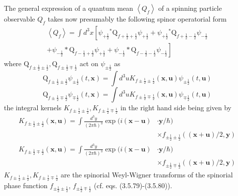 \documentclass{article}
\begin{document}
The general expression of a quantum mean $\left\langle Q_{f}\right\rangle$ of a spinning particle observable $Q_{f}$ takes now presumably the following spinor operatorial form
$$
\begin{array}{r}
\left\langle Q_{f}\right\rangle=\int d^{3} x\left[\psi_{+\frac{1}{2}}{ }^{*} \mathrm{Q}_{f+\frac{1}{2}+\frac{1}{2}} \psi_{+\frac{1}{2}}+\psi_{+\frac{1}{2}}{ }^{*} \mathrm{Q}_{f+\frac{1}{2}-\frac{1}{2}} \psi_{-\frac{1}{2}}\right.  \tag{3.21.12}\\
\left.+\psi_{-\frac{1}{2}} * \mathrm{Q}_{f-\frac{1}{2}+\frac{1}{2}} \psi_{+\frac{1}{2}}+\psi_{-\frac{1}{2}} * \mathrm{Q}_{f-\frac{1}{2}-\frac{1}{2}} \psi_{-\frac{1}{2}}\right]
\end{array}
$$
where $\mathrm{Q}_{f \pm \frac{1}{2} \pm \frac{1}{2}}, \mathrm{Q}_{f \pm \frac{1}{2} \mp \frac{1}{2}}$ act on $\psi_{ \pm \frac{1}{2}}$ as
$$
\begin{equation*}
\mathrm{Q}_{f \pm \frac{1}{2} \pm \frac{1}{2}} \psi_{ \pm \frac{1}{2}}(t, \boldsymbol{x})=\int d^{3} u K_{f \pm \frac{1}{2} \pm \frac{1}{2}}(\boldsymbol{x}, \boldsymbol{u}) \psi_{ \pm \frac{1}{2}}(t, \boldsymbol{u}) \tag{3.21.13a}
\end{equation*}
$$
$$
\begin{equation*}
\mathrm{Q}_{f \pm \frac{1}{2} \mp \frac{1}{2}} \psi_{\mp \frac{1}{2}}(t, \boldsymbol{x})=\int d^{3} u K_{f \pm \frac{1}{2} \mp \frac{1}{2}}(\boldsymbol{x}, \boldsymbol{u}) \psi_{\mp \frac{1}{2}}(t, \boldsymbol{u}) \tag{3.21.13b}
\end{equation*}
$$
the integral kernels $K_{f \pm \frac{1}{2} \pm \frac{1}{2}}, K_{f \pm \frac{1}{2} \mp \frac{1}{2}}$ in the right hand side being given by
$$
\begin{align*}
K_{f \pm \frac{1}{2} \pm \frac{1}{2}}(\boldsymbol{x}, \boldsymbol{u})=\int \frac{d^{3} y}{(2 \pi \hbar)^{3}} \exp (i(\boldsymbol{x}-\boldsymbol{u}) & \cdot \boldsymbol{y} / \hbar)  \tag{3.21.14a}\\
& \times f_{ \pm \frac{1}{2} \pm \frac{1}{2}}((\boldsymbol{x}+\boldsymbol{u}) / 2, \boldsymbol{y}) \\
K_{f \pm \frac{1}{2} \mp \frac{1}{2}}(\boldsymbol{x}, \boldsymbol{u})=\int \frac{d^{3} y}{(2 \pi \hbar)^{3}} \exp (i(\boldsymbol{x}-\boldsymbol{u}) & \cdot \boldsymbol{y} / \hbar)  \tag{3.21.14b}\\
& \times f_{ \pm \frac{1}{2} \mp \frac{1}{2}}((\boldsymbol{x}+\boldsymbol{u}) / 2, \boldsymbol{y})
\end{align*}
$$
$K_{f \pm \frac{1}{2} \pm \frac{1}{2}}, K_{f \pm \frac{1}{2} \mp \frac{1}{2}}$ are the spinorial Weyl-Wigner transforms of the spinorial phase function $f_{ \pm \frac{1}{2} \pm \frac{1}{2}}$, $f_{ \pm \frac{1}{2} \mp \frac{1}{2}}$ (cf. eqs. (3.5.79)-(3.5.80)).
\end{document}
